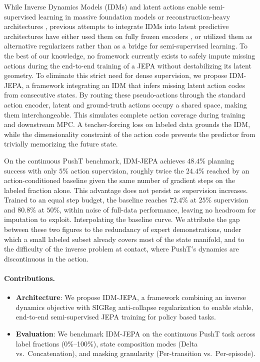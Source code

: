 \documentclass{article}
\begin{document}
While Inverse Dynamics Models (IDMs) and latent actions enable semi-supervised
learning in massive foundation models or reconstruction-heavy architectures
\cite{genie}, previous attempts to integrate IDMs into latent predictive
architectures have either used them on fully frozen encoders \cite{dynamo}, or
utilized them as alternative regularizers \cite{sensorimotor} rather than as a bridge for
semi-supervised learning. To the best of our knowledge, no framework currently
exists to safely impute missing actions during the end-to-end training of a JEPA
without destabilizing its latent geometry. To eliminate this strict need for dense
supervision, we propose IDM-JEPA, a framework integrating an IDM that infers
missing latent action codes from consecutive states. By routing these
pseudo-actions through the standard action encoder, latent and ground-truth actions
occupy a shared space, making them interchangeable. This simulates complete action
coverage during training and downstream MPC. A teacher-forcing loss on labeled data
grounds the IDM, while the dimensionality constraint of the action code prevents
the predictor from trivially memorizing the future state.

On the continuous PushT benchmark, IDM-JEPA achieves $48.4\%$ planning success with
only $5\%$ action supervision, roughly twice the $24.4\%$ reached by an
action-conditioned baseline given the same number of gradient steps on the labeled
fraction alone. This advantage does not persist as supervision increases. Trained to
an equal step budget, the baseline reaches $72.4\%$ at $25\%$ supervision and
$80.8\%$ at $50\%$, within noise of full-data performance, leaving no headroom for
imputation to exploit. Interpolating the baseline curve. We
attribute the gap between these two figures to the redundancy of expert
demonstrations, under which a small labeled subset already covers most of the state
manifold, and to the difficulty of the inverse problem at contact, where PushT's
dynamics are discontinuous in the action.


\paragraph{Contributions.}
\begin{itemize}
  \item \textbf{Architecture}: We propose IDM-JEPA, a framework combining an inverse
    dynamics objective with SIGReg anti-collapse regularization to enable stable,
    end-to-end semi-supervised JEPA training for policy based tasks.
  \item \textbf{Evaluation}: We benchmark IDM-JEPA on the continuous PushT task
    across label fractions (0\%--100\%), state composition modes (Delta vs.\
    Concatenation), and masking granularity (Per-transition vs.\ Per-episode).
 
\end{itemize}
\end{document}
